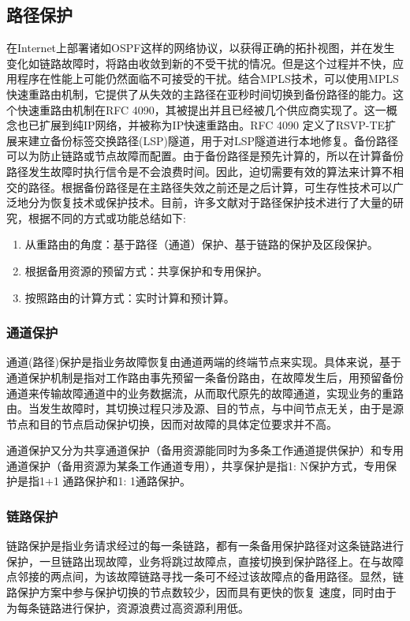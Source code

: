 \subsection{路径保护}
在Internet上部署诸如OSPF这样的网络协议，以获得正确的拓扑视图，并在发生变化如链路故障时，将路由收敛到新的不受干扰的情况。但是这个过程并不快，应用程序在性能上可能仍然面临不可接受的干扰。结合MPLS技术，可以使用MPLS快速重路由机制，它提供了从失效的主路径在亚秒时间切换到备份路径的能力。这个快速重路由机制在RFC 4090\cite{pan2005fast}，其被提出并且已经被几个供应商实现了。这一概念也已扩展到纯IP网络，并被称为IP快速重路由\cite{shand2010ip}。RFC 4090 定义了RSVP-TE扩展来建立备份标签交换路径(LSP)隧道，用于对LSP隧道进行本地修复。备份路径可以为防止链路或节点故障而配置。由于备份路径是预先计算的，所以在计算备份路径发生故障时执行信令是不会浪费时间。因此，迫切需要有效的算法来计算不相交的路径。根据备份路径是在主路径失效之前还是之后计算，可生存性技术可以广泛地分为恢复技术或保护技术。目前，许多文献对于路径保护技术进行了大量的研究，根据不同的方式或功能总结如下:
\begin{enumerate}
\item 从重路由的角度：基于路径（通道）保护、基于链路的保护及区段保护。
\item 根据备用资源的预留方式：共享保护和专用保护。
\item 按照路由的计算方式：实时计算和预计算。
\end{enumerate}
\subsubsection{通道保护}
通道(路径)保护是指业务故障恢复由通道两端的终端节点来实现。具体来说，基于通道保护机制是指对工作路由事先预留一条备份路由，在故障发生后，用预留备份通道来传输故障通道中的业务数据流，从而取代原先的故障通道，实现业务的重路由。当发生故障时，其切换过程只涉及源、目的节点，与中间节点无关，由于是源节点和目的节点启动保护切换，因而对故障的具体定位要求并不高。

通道保护又分为共享通道保护（备用资源能同时为多条工作通道提供保护）和专用通道保护（备用资源为某条工作通道专用），共享保护是指1: N保护方式，专用保护是指1+1 通路保护和1: 1通路保护。
\subsubsection{链路保护}
链路保护是指业务请求经过的每一条链路，都有一条备用保护路径对这条链路进行保护，一旦链路出现故障，业务将跳过故障点，直接切换到保护路径上。在与故障点邻接的两点间，为该故障链路寻找一条可不经过该故障点的备用路径。显然，链路保护方案中参与保护切换的节点数较少，因而具有更快的恢复 速度，同时由于为每条链路进行保护，资源浪费过高资源利用低。

